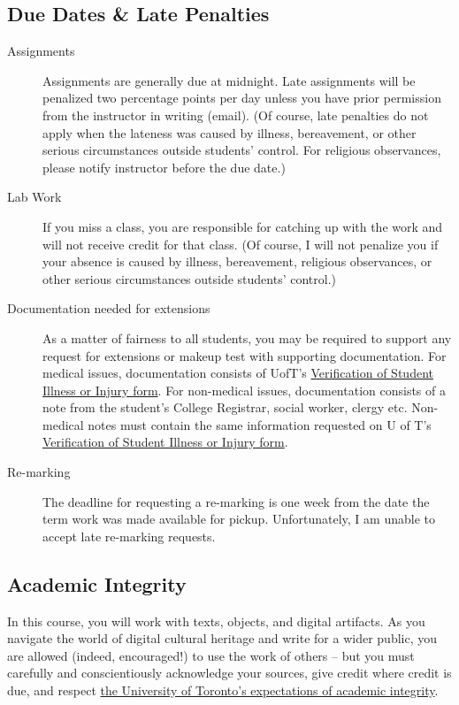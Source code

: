 \documentclass[11pt]{article}
\begin{document}
\subsection*{Due Dates \& Late Penalties}
\label{sec:orgbfcc465}
\begin{description}
\item[{Assignments}] Assignments are generally due at midnight. Late assignments will be penalized two percentage points per day unless you have prior permission from the instructor in writing (email). (Of course, late penalties do not apply when the lateness was caused by illness, bereavement, or other serious circumstances outside students' control. For religious observances, please notify instructor before the due date.)

\item[{Lab Work}] If you miss a class, you are responsible for catching up with the work and will not receive credit for that class. (Of course, I will not penalize you if your absence is caused by illness, bereavement, religious observances, or other serious circumstances outside students' control.)

\item[{Documentation needed for extensions}] As a matter of fairness to all students, you may be required to support any request for extensions or makeup test with supporting documentation. For medical issues, documentation consists of UofT's \href{http://www.illnessverification.utoronto.ca/getattachment/index/Verification-of-Illness-or-Injury-form-Jan-22-2013.pdf.aspx}{Verification of Student Illness or Injury form}. For non-medical issues, documentation consists of a note from the student's College Registrar, social worker, clergy etc. Non-medical notes must contain the same information requested on U of T's \href{http://www.illnessverification.utoronto.ca/getattachment/index/Verification-of-Illness-or-Injury-form-Jan-22-2013.pdf.aspx}{Verification of Student Illness or Injury form}.

\item[{Re-marking}] The deadline for requesting a re-marking is one week from the date the term work was made available for pickup. Unfortunately, I am unable to accept late re-marking requests.
\end{description}

\subsection*{Academic Integrity}
\label{sec:orgda7e248}
In this course, you will work with texts, objects, and digital artifacts. As you navigate the world of digital cultural heritage and write for a wider public, you are allowed (indeed, encouraged!) to use the work of others -- but you must carefully and conscientiously acknowledge your sources, give credit where credit is due, and respect \href{https://www.academicintegrity.utoronto.ca/}{the University of Toronto's expectations of academic integrity}.
\end{document}
